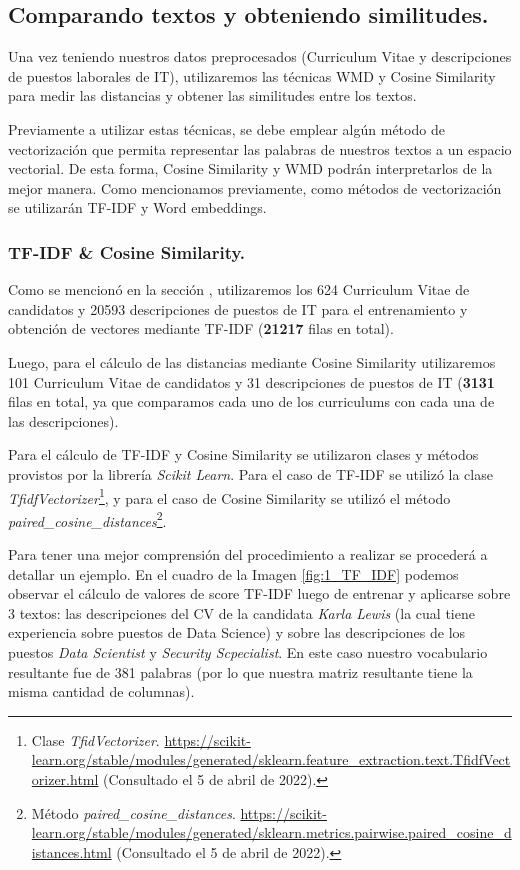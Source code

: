 \documentclass[12pt,a4paper]{article}
\begin{document}
\begin{sloppypar}
\subsection{Comparando textos y obteniendo similitudes.}

Una vez teniendo nuestros datos preprocesados (Curriculum Vitae y descripciones de puestos laborales de IT), utilizaremos las técnicas WMD y Cosine Similarity para medir las distancias y obtener las similitudes entre los textos. 

Previamente a utilizar estas técnicas, se debe emplear algún método de vectorización que permita representar las palabras de nuestros textos a un espacio vectorial. De esta forma, Cosine Similarity y WMD podrán interpretarlos de la mejor manera. Como mencionamos previamente, como métodos de vectorización se utilizarán TF-IDF y Word embeddings. 

\subsubsection{TF-IDF \& Cosine Similarity.}

Como se mencionó en la sección \textit{}, utilizaremos los 624 Curriculum Vitae de candidatos y 20593 descripciones de puestos de IT para el entrenamiento y obtención de vectores mediante TF-IDF (\textbf{21217} filas en total).

Luego, para el cálculo de las distancias mediante Cosine Similarity utilizaremos 101 Curriculum Vitae de candidatos y 31 descripciones de puestos de IT (\textbf{3131} filas en total, ya que comparamos cada uno de los curriculums con cada una de las descripciones).

Para el cálculo de TF-IDF y Cosine Similarity se utilizaron clases y métodos provistos por la librería \textit{Scikit Learn}. Para el caso de TF-IDF se utilizó la clase \textit{TfidfVectorizer}\footnote{Clase \textit{TfidVectorizer}. \url{https://scikit-learn.org/stable/modules/generated/sklearn.feature_extraction.text.TfidfVectorizer.html} (Consultado el 5 de abril de 2022).}, y para el caso de Cosine Similarity se utilizó el método \textit{paired\_cosine\_distances}\footnote{Método \textit{paired\_cosine\_distances}. \url{https://scikit-learn.org/stable/modules/generated/sklearn.metrics.pairwise.paired_cosine_distances.html} (Consultado el 5 de abril de 2022).}.

Para tener una mejor comprensión del procedimiento a realizar se procederá a detallar un ejemplo. En el cuadro de la Imagen \ref{fig:1_TF_IDF} podemos observar el cálculo de valores de score TF-IDF luego de entrenar y aplicarse sobre 3 textos: las descripciones del CV de la candidata \textit{Karla Lewis} (la cual tiene experiencia sobre puestos de Data Science) y sobre las descripciones de los puestos \textit{Data Scientist} y \textit{Security Scpecialist}. En este caso nuestro vocabulario resultante fue de 381 palabras (por lo que nuestra matriz resultante tiene la misma cantidad de columnas). 


\end{sloppypar}
\end{document}
